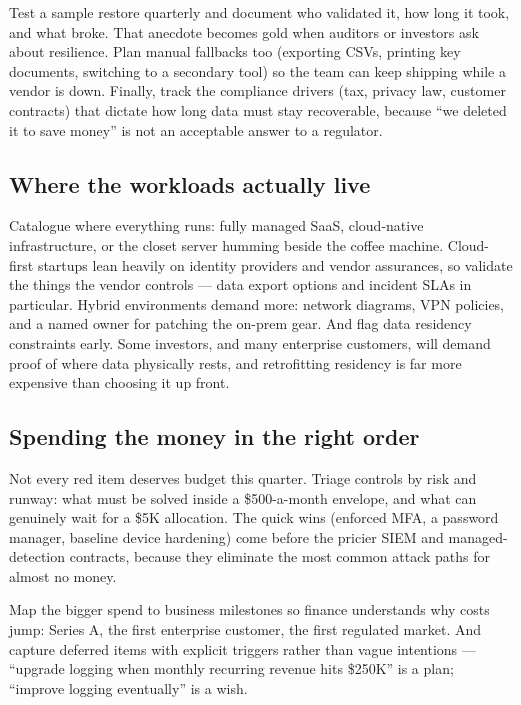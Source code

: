 Test a sample restore quarterly and document who validated it, how long it took, and what broke. That anecdote becomes gold when auditors or investors ask about resilience. Plan manual fallbacks too (exporting CSVs, printing key documents, switching to a secondary tool) so the team can keep shipping while a vendor is down. Finally, track the compliance drivers (tax, privacy law, customer contracts) that dictate how long data must stay recoverable, because ``we deleted it to save money'' is not an acceptable answer to a regulator.



\subsection{Where the workloads actually live}


Catalogue where everything runs: fully managed SaaS, cloud-native infrastructure, or the closet server humming beside the coffee machine. Cloud-first startups lean heavily on identity providers and vendor assurances, so validate the things the vendor controls — data export options and incident SLAs in particular. Hybrid environments demand more: network diagrams, VPN policies, and a named owner for patching the on-prem gear. And flag data residency constraints early. Some investors, and many enterprise customers, will demand proof of where data physically rests, and retrofitting residency is far more expensive than choosing it up front.



\subsection{Spending the money in the right order}


Not every red item deserves budget this quarter. Triage controls by risk and runway: what must be solved inside a \$500-a-month envelope, and what can genuinely wait for a \$5K allocation. The quick wins (enforced MFA, a password manager, baseline device hardening) come before the pricier SIEM and managed-detection contracts, because they eliminate the most common attack paths for almost no money.


Map the bigger spend to business milestones so finance understands why costs jump: Series A, the first enterprise customer, the first regulated market. And capture deferred items with explicit triggers rather than vague intentions — ``upgrade logging when monthly recurring revenue hits \$250K'' is a plan; ``improve logging eventually'' is a wish.



